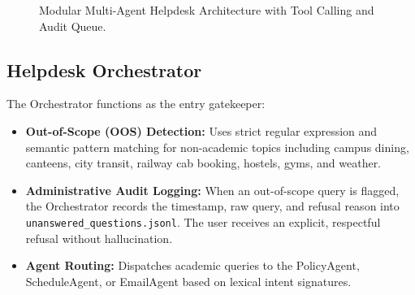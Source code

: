 \documentclass[10pt,a4paper]{article}
\begin{document}
\begin{figure}[htbp]
\centering
{}
\caption{Modular Multi-Agent Helpdesk Architecture with Tool Calling and Audit Queue.}
\label{fig:arch}
\end{figure}

\subsection{Helpdesk Orchestrator}
The Orchestrator functions as the entry gatekeeper:
\begin{itemize}[noitemsep]
    \item \textbf{Out-of-Scope (OOS) Detection:} Uses strict regular expression and semantic pattern matching for non-academic topics including campus dining, canteens, city transit, railway cab booking, hostels, gyms, and weather.
    \item \textbf{Administrative Audit Logging:} When an out-of-scope query is flagged, the Orchestrator records the timestamp, raw query, and refusal reason into \texttt{unanswered\_questions.jsonl}. The user receives an explicit, respectful refusal without hallucination.
    \item \textbf{Agent Routing:} Dispatches academic queries to the PolicyAgent, ScheduleAgent, or EmailAgent based on lexical intent signatures.
\end{itemize}
\end{document}
